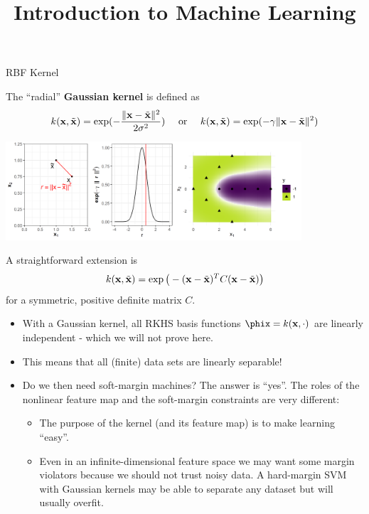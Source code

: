 \documentclass[11pt,compress,t,notes=noshow, xcolor=table]{beamer}
\title{Introduction to Machine Learning}
\begin{document}

\begin{vbframe}{RBF Kernel}

The \enquote{radial} \textbf{Gaussian kernel} is defined as
$$k(\mathbf{x}, \tilde {\mathbf{x}}) = \exp(-\frac{\|\mathbf{x} - \tilde {\mathbf{x}}\|^2}{2\sigma^2}) \quad \text{ or } \quad k(\mathbf{x}, \tilde {\mathbf{x}}) = \exp(-\gamma \|\mathbf{x} - \tilde {\mathbf{x}}\|^2)$$

\begin{center}
\includegraphics[width = 11cm ]{figure/svm_rbf_kernel.png}
\end{center}

A straightforward extension is
$$k(\mathbf{x},  \tilde {\mathbf{x}}) = \exp\big(- (\mathbf{x} -  \tilde {\mathbf{x}})^T C (\mathbf{x} -  \tilde {\mathbf{x}})\big)$$
for a symmetric, positive definite matrix $C$.

\framebreak

  \begin{itemize}

    \item With a Gaussian kernel, all RKHS basis functions 
      $\phix = k(\xv, \cdot)$ are linearly independent - which we will not prove here.
    \item This means that all (finite) data sets are linearly separable!
    \item Do we then need soft-margin machines? 
      The answer is \enquote{yes}. The roles of the nonlinear feature map and the
    soft-margin constraints are very different:
    \begin{itemize}
      \item The purpose of the kernel (and its feature map) is to make learning
      \enquote{easy}.
\item Even in an infinite-dimensional feature space we may want some
      margin violators because we should not trust noisy data. A hard-margin
      SVM with Gaussian kernels may be able to separate any dataset but will usually overfit.
    \end{itemize}
  \end{itemize}
\end{vbframe}
\end{document}
